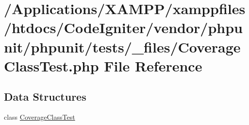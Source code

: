 \hypertarget{phpunit_2tests_2__files_2_coverage_class_test_8php}{}\section{/\+Applications/\+X\+A\+M\+P\+P/xamppfiles/htdocs/\+Code\+Igniter/vendor/phpunit/phpunit/tests/\+\_\+files/\+Coverage\+Class\+Test.php File Reference}
\label{phpunit_2tests_2__files_2_coverage_class_test_8php}
\subsection*{Data Structures}
\begin{DoxyCompactItemize}
\item 
class \mbox{\hyperlink{class_coverage_class_test}{Coverage\+Class\+Test}}
\end{DoxyCompactItemize}
